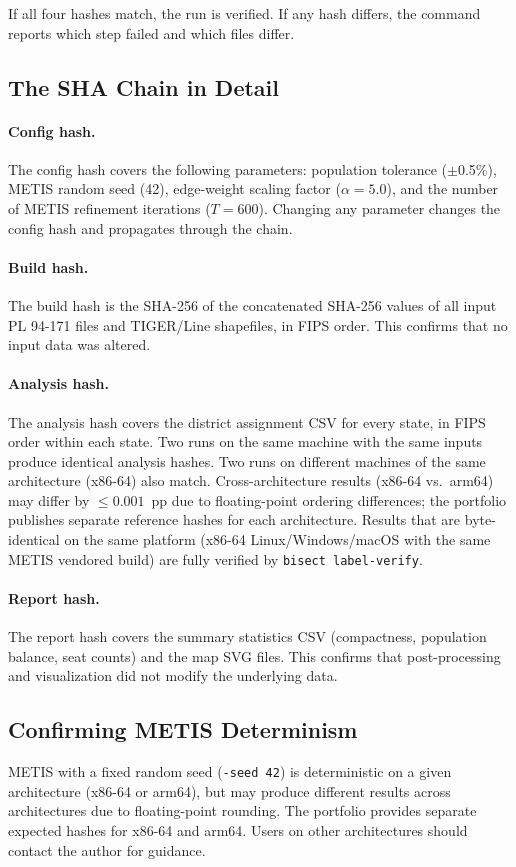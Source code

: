 \noindent If all four hashes match, the run is verified.
If any hash differs, the command reports which step failed and which files differ.

\subsection*{The SHA Chain in Detail}

\paragraph{Config hash.}
The config hash covers the following parameters:
population tolerance ($\pm$0.5\%), METIS random seed (42), edge-weight scaling
factor ($\alpha = 5.0$), and the number of METIS refinement iterations ($T = 600$).
Changing any parameter changes the config hash and propagates through the chain.

\paragraph{Build hash.}
The build hash is the SHA-256 of the concatenated SHA-256 values of all
input PL 94-171 files and TIGER/Line shapefiles, in FIPS order.
This confirms that no input data was altered.

\paragraph{Analysis hash.}
The analysis hash covers the district assignment CSV for every state,
in FIPS order within each state.
Two runs on the same machine with the same inputs produce identical
analysis hashes.
Two runs on different machines of the same architecture (x86-64) also match.
Cross-architecture results (x86-64 vs.\ arm64) may differ by $\leq 0.001$~pp
due to floating-point ordering differences; the portfolio publishes separate
reference hashes for each architecture.
Results that are byte-identical on the same platform
(x86-64 Linux/Windows/macOS with the same METIS vendored build) are
fully verified by \texttt{bisect label-verify}.

\paragraph{Report hash.}
The report hash covers the summary statistics CSV (compactness, population
balance, seat counts) and the map SVG files.
This confirms that post-processing and visualization did not modify
the underlying data.

\subsection*{Confirming METIS Determinism}

METIS with a fixed random seed (\texttt{-seed 42}) is deterministic
on a given architecture (x86-64 or arm64), but may produce different
results across architectures due to floating-point rounding.
The portfolio provides separate expected hashes for x86-64 and arm64.
Users on other architectures should contact the author for guidance.

